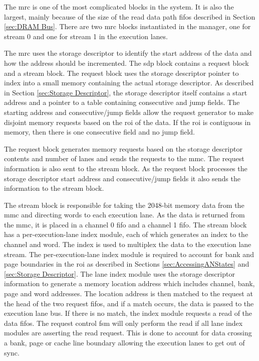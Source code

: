 The \ac{mrc} is one of the most complicated blocks in the system.  It is also the largest, mainly because of the size of the read data path \acp{fifo} described in Section \ref{sec:DRAM Bus}.
There are two \ac{mrc} blocks instantiated in the manager, one for stream 0 and one for stream 1 in the execution lanes.

The \ac{mrc} uses the storage descriptor to identify the start address of the data and how the address should be incremented.
The \ac{sdp} block contains a request block and a stream block.
The request block uses the storage descriptor pointer to index into a small memory containing the actual storage descriptor. 
As described in Section \ref{sec:Storage Descriptor}, the storage descriptor itself contains a start address and a pointer to a table containing consecutive and jump fields.
The starting address and consecutive/jump fields allow the request generator to make disjoint memory requests based on the \ac{roi} of the data. 
If the \ac{roi} is contiguous in memory, then there is one consecutive field and no jump field.

The request block generates memory requests based on the storage descriptor contents and number of lanes and sends the requests to the \ac{mmc}.
The request information is also sent to the stream block.
As the request block processes the storage descriptor start address and consecutive/jump fields it also sends the information to the stream block.

The stream block is responsible for taking the 2048-bit memory data from the \ac{mmc} and directing words to each execution lane.
As the data is returned from the \ac{mmc}, it is placed in a channel 0 \ac{fifo} and a channel 1 \ac{fifo}. 
The stream block has a per-execution-lane index module, each of which generates an index to the channel and word.
The index is used to multiplex the data to the execution lane stream.
The per-execution-lane index module is required to account for bank and page boundaries in the \ac{roi} as described in Sections \ref{sec:AccessingANStates} and \ref{sec:Storage Descriptor}.
The lane index module uses the storage descriptor information to generate a memory location address which includes channel, bank, page and word addresses.
The location address is then matched to the request at the head of the two request \acp{fifo}, and if a match occurs, the data is passed to the execution lane bus.
If there is no match, the index module requests a read of the data \acp{fifo}. The request control \ac{fsm} will only perform the read if all lane index modules are asserting the read request.
This is done to account for data crossing a bank, page or cache line boundary allowing the execution lanes to get out of sync.


